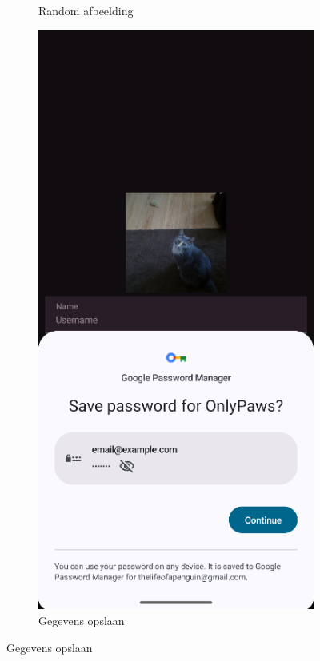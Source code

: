 \documentclass{report}
\begin{document}
\begin{figure}[h]
\begin{subfigure}[b]{0.32\textwidth}
        \caption{Random afbeelding}
    \end{subfigure}
    \hfill
    \begin{subfigure}[b]{0.32\textwidth}
        \includegraphics[width=\textwidth]{DEMO_RegSave.png} 
        \caption{Gegevens opslaan}
    \end{subfigure}

\end{figure}
\end{document}

